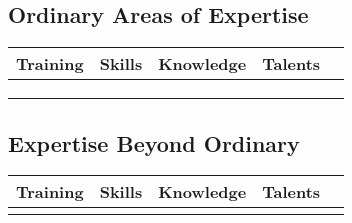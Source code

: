 

\subsection{Ordinary Areas of Expertise}

\begin{center}
	\scriptsize
	\begin{xltabular}{\textwidth}{XXXXl}
		Training				&	Skills					& Knowledge					&  Talents 				& \\
		\hline
		\listUniversalTraining	&	\listUniversalSkills	&	\listUniversalKnowledge	& \listUniversalTalents &  \\
		\listModernTraining		&	\listModernSkills		&	\listModernKnowledge	& \listModernTalents	&  \\
		\listMedievalTraining	&	\listMedievalSkills		&	\listMedievalKnowledge	&   					&  \\
	\end{xltabular}
\end{center}

\subsection{Expertise Beyond Ordinary}

\begin{center}
	\begin{xltabular}{\textwidth}{XXXXl}
		Training								&	Skills									& Knowledge								&  Talents & \\
		\hline
		\footnotesize \listFantasyTraining		&	\footnotesize	\listFantasySkills		&\footnotesize \listFantasyKnowledge	& \footnotesize  \listFantasyTalents 	&  \\
	\end{xltabular}
\end{center}


